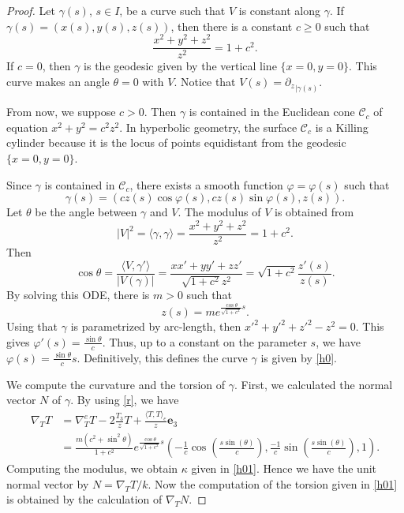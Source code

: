 \documentclass[a4paper,12pt]{amsart}
\theoremstyle{definition}
\def\e{\mathbf e}
\begin{document}
  \begin{proof}
    Let $\gamma(s)$, $s\in I$, be a curve such that $V$ is constant along $\gamma$. If $\gamma(s)=(x(s),y(s),z(s))$, then there is a constant $c\geq 0$  such that 
  $$\frac{x^2+y^2+z^2}{z^2}=1+c^2.$$
  If $c=0$, then $\gamma$ is the geodesic given by the vertical line $\{x=0,y=0\}$. This curve makes an angle $\theta=0$ with $V$. Notice that $V(s)={\partial_z}_{|\gamma(s)}$.
  
  From now, we suppose $c>0$. Then  $\gamma$ is contained in the Euclidean  cone $\mathcal{C}_c$ of equation $x^2+y^2=c^2 z^2$. In hyperbolic geometry, the surface $\mathcal{C}_c$ is a Killing cylinder  because it is the locus of points equidistant from the geodesic $\{x=0,y=0\}$.
  
  Since $\gamma$ is contained in $\mathcal{C}_c$,   there exists a smooth function $\varphi=\varphi(s)$ such that 
 \begin{equation}\label{p1}
 \gamma(s)=(cz(s)\cos\varphi(s),cz(s)\sin\varphi(s),z(s)).
 \end{equation}
 Let $\theta$ be the angle between $\gamma$ and $V$. The modulus of $V$ is obtained from 
 $$|V|^2=\langle \gamma,\gamma\rangle=\frac{x^2+y^2+z^2}{z^2}=1+c^2.$$
 Then
 $$\cos\theta=\frac{\langle V,\gamma'\rangle}{|V(\gamma)|}=\frac{xx'+yy'+zz'}{\sqrt{1+c^2}z^2}=\sqrt{1+c^2}\frac{ z'(s)}{z(s)}.$$
 By solving this ODE,  there is $m>0$ such that
 $$z(s)=me^{\frac{\cos\theta}{\sqrt{1+c^2}}s}.$$
 Using that $\gamma$ is parametrized by arc-length, then $x'^2+y'^2+z'^2-z^2=0$. This gives 
 $\varphi'(s)=\frac{\sin\theta}{c}$. Thus, up to a constant on the parameter $s$, we have  $\varphi(s)=\frac{\sin\theta}{c}s$. Definitively, this defines the curve $\gamma$  is given by \eqref{h0}.
 
  We compute the curvature and the torsion of $\gamma$. First, we calculated the normal vector $N$ of $\gamma$. By using \eqref{r}, we have 
\begin{equation}\label{normal}
\begin{split}
\nabla_TT&=\nabla^e_TT-2\frac{T_3}{z}T+\frac{\langle T,T\rangle_e}{z}\e_3\\
&=\frac{m(c^2+\sin^2\theta)}{1+c^2}e^{\frac{\cos\theta}{\sqrt{1+c^2}}s}\left(-\frac{1 }{  c}\cos \left(\frac{s \sin (\theta )}{c}\right),\frac{ - 1}{ c}\sin \left(\frac{s \sin (\theta )}{c}\right) , 1 \right). 
\end{split}
\end{equation}
Computing the modulus, we obtain $\kappa$ given in \eqref{h01}. Hence we have  the unit normal vector by $N=\nabla_TT/k$. Now the computation of the torsion given in \eqref{h01} is obtained by the calculation of  $\nabla_TN$. 


\end{proof}
\end{document}

